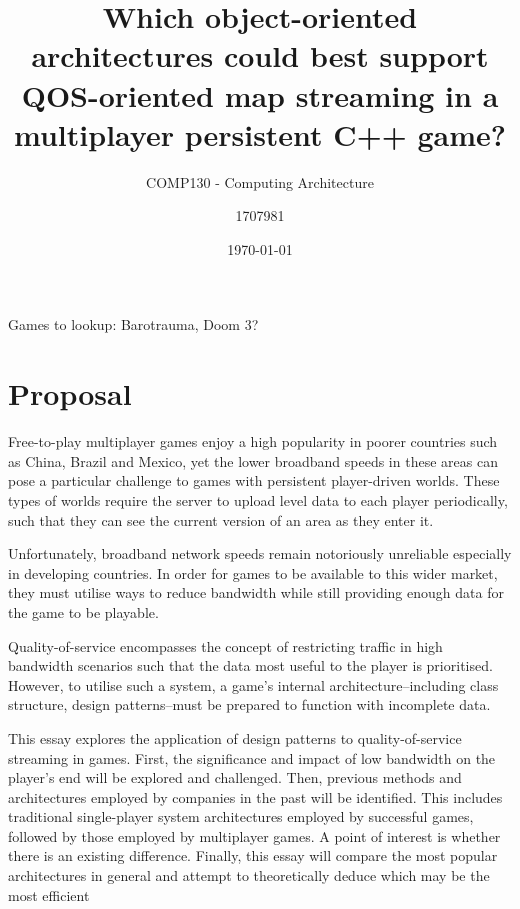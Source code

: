 \documentclass{scrartcl}
\title{Which object-oriented architectures could best support QOS-oriented map streaming in a multiplayer persistent C++ game?}
\subtitle{COMP130 - Computing Architecture}
\date{\today}
\author{1707981}
\begin{document}
	\maketitle

Games to lookup: Barotrauma, Doom 3?

\section{Proposal}
Free-to-play multiplayer games enjoy a high popularity in poorer countries such as China, Brazil and Mexico, yet the lower broadband speeds in these areas can pose a particular challenge to games with persistent player-driven worlds. These types of worlds require the server to upload level data to each player periodically, such that they can see the current version of an area as they enter it.

Unfortunately, broadband network speeds remain notoriously unreliable especially in developing countries. In order for games to be available to this wider market, they must utilise ways to reduce bandwidth while still providing enough data for the game to be playable. 

Quality-of-service encompasses the concept of restricting traffic in high bandwidth scenarios such that the data most useful to the player is prioritised. However, to utilise such a system, a game's internal architecture--including class structure, design patterns--must be prepared to function with incomplete data.

This essay explores the application of design patterns to quality-of-service streaming in games. First, the significance and impact of low bandwidth on the player's end will be explored and challenged. Then, previous methods and architectures employed by companies in the past will be identified. This includes traditional single-player system architectures employed by successful games, followed by those employed by multiplayer games. A point of interest is whether there is an existing difference. Finally, this essay will compare the most popular architectures in general and attempt to theoretically deduce
 which may be the most efficient
\nocite{*}
 

\end{document}
